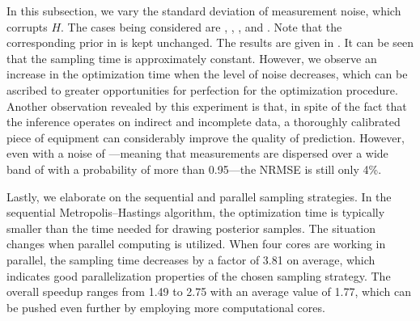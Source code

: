 
In this subsection, we vary the standard deviation of measurement noise, which
corrupts $H$. The cases being considered are , ,
, and  \cite{mesa-martinez2007}. Note that the
corresponding prior in  is kept unchanged. The results are
given in . It can be seen that the sampling time is
approximately constant. However, we observe an increase in the optimization time
when the level of noise decreases, which can be ascribed to greater
opportunities for perfection for the optimization procedure. Another observation
revealed by this experiment is that, in spite of the fact that the inference
operates on indirect and incomplete data, a thoroughly calibrated piece of
equipment can considerably improve the quality of prediction. However, even with
a noise of ---meaning that measurements are dispersed over a wide
band of  with a probability of more than 0.95---the \ac{NRMSE} is
still only 4\%.


Lastly, we elaborate on the sequential and parallel sampling strategies. In the
sequential Metropolis--Hastings algorithm, the optimization time is typically
smaller than the time needed for drawing posterior samples. The situation
changes when parallel computing is utilized. When four cores are working in
parallel, the sampling time decreases by a factor of 3.81 on average, which
indicates good parallelization properties of the chosen sampling strategy. The
overall speedup ranges from 1.49 to 2.75 with an average value of 1.77, which
can be pushed even further by employing more computational cores.
